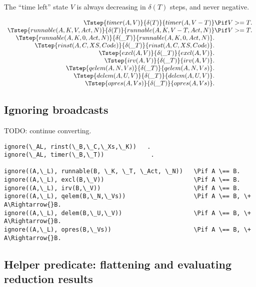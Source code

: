 The ``time left'' state \(V\) is always decreasing in \(\delta(T)\) steps, and never negative.

\[
\begin{array}{r@{}c@{}lcl}
  \Tstep{timer(A, V)              }{\delta(T)  }{timer(A, V-T)              } &\Pif&    V >= T.
\\\Tstep{runnable(A, K, V, Act, N)}{\delta(T)  }{runnable(A, K, V-T, Act, N)} &\Pif&    V >= T.
\\\Tstep{runnable(A, K, 0, Act, N)}{\delta(\_T)}{runnable(A, K, 0, Act, N)  }.
\\\Tstep{rinst(A, C, XS, Code)    }{\delta(\_T)}{rinst(A, C, XS, Code)      }.
\\\Tstep{excl(A, V)               }{\delta(\_T)}{excl(A, V)                 }.
\\\Tstep{irv(A, V)                }{\delta(\_T)}{irv(A, V)                  }.
\\\Tstep{qelem(A, N, Vs)          }{\delta(\_T)}{qelem(A, N, Vs)            }.
\\\Tstep{delem(A, U, V)           }{\delta(\_T)}{delem(A, U, V)             }.
\\\Tstep{opres(A, Vs)             }{\delta(\_T)}{opres(A, Vs)               }.
\end{array}
\]

\subsection{Ignoring broadcasts}

TODO: continue converting.

\begin{verbatim}
ignore(\_AL, rinst(\_B,\_C,\_Xs,\_K))   .
ignore(\_AL, timer(\_B,\_T))             .

ignore((A,\_L), runnable(B, \_K, \_T, \_Act, \_N))   \Pif A \== B.
ignore((A,\_L), excl(B,\_V))                         \Pif A \== B.
ignore((A,\_L), irv(B,\_V))                          \Pif A \== B.
ignore((A,\_L), qelem(B,\_N,\_Vs))                   \Pif A \== B, \+ A\Rightarrow{}B.
ignore((A,\_L), delem(B,\_U,\_V))                    \Pif A \== B, \+ A\Rightarrow{}B.
ignore((A,\_L), opres(B,\_Vs))                       \Pif A \== B, \+ A\Rightarrow{}B.
\end{verbatim}


\subsection{Helper predicate: flattening and evaluating reduction results}

